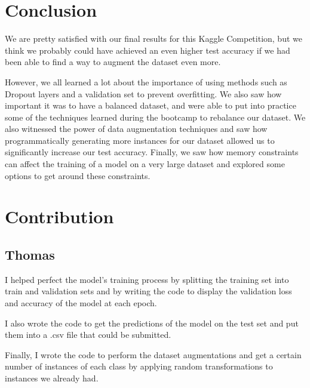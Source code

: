\documentclass[12pt]{article}
\begin{document}
\section{Conclusion}
We are pretty satisfied with our final results for this Kaggle Competition, but we think we probably could have achieved an even higher test accuracy if we had been able to find a way to augment the dataset even more. 

However, we all learned a lot about the importance of using methods such as Dropout layers and a validation set to prevent overfitting. We also saw how important it was to have a balanced dataset, and were able to put into practice some of the techniques learned during the bootcamp to rebalance our dataset. We also witnessed the power of data augmentation techniques and saw how programmatically generating more instances for our dataset allowed us to significantly increase our test accuracy. Finally, we saw how memory constraints can affect the training of a model on a very large dataset and explored some options to get around these constraints.
\section{Contribution}

\subsection{Thomas}
I helped perfect the model's training process by splitting the training set into train and validation sets and by writing the code to display the validation loss and accuracy of the model at each epoch.

I also wrote the code to get the predictions of the model on the test set and put them into a .csv file that could be submitted. 

Finally, I wrote the code to perform the dataset augmentations and get a certain number of instances of each class by applying random transformations to instances we already had.
\end{document}
